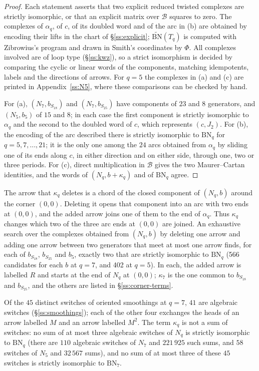 \begin{proof}
Each statement asserts that two explicit reduced twisted complexes are strictly isomorphic, or that
an explicit matrix over $\mathcal B$ squares to zero.  The complexes
of $\alpha_q$, of $c$, of its doubled word and of the arc in (b) are obtained by encoding their lifts
in the chart of \S\ref{ss:explicit}; $\widetilde{\mathrm{BN}}(T_q)$ is computed with Zibrowius's
program \cite{Zibkht} and drawn in Smith's coordinates by $\Phi$.  All complexes involved are of loop
type (\S\ref{ss:kwz}), so a strict isomorphism is decided by comparing the cyclic or linear words of the
components, matching idempotents, labels and the directions of arrows.  For $q=5$ the complexes in (a)
and (c) are printed in Appendix~\ref{ss:N5}, where these comparisons can be checked by hand.

For (a), $(N_7,b_{S_{18}})$ and $(N_7,b_{S_{25}})$ have components of $23$ and $8$ generators, and
$(N_5,b_5)$ of $15$ and $8$; in each case the first component is strictly isomorphic to $\alpha_q$
and the second to the doubled word of $c$, which represents $(c,J_2)$.  For (b), the encoding of the
arc described there is strictly isomorphic to $\mathrm{BN}_q$ for $q=5,7,\dots,21$; it is the only
one among the $24$ arcs obtained from $\alpha_q$ by sliding one of its ends along $c$, in either
direction and on either side, through one, two or three periods.  For (c), direct multiplication in
$\mathcal B$ gives the two Maurer--Cartan identities, and the words of $(N_q,b+\kappa_q)$ and of
$\mathrm{BN}_q$ agree.
\end{proof}

\begin{remark}\label{rem:corner-term}
The arrow that $\kappa_q$ deletes is a chord of the closed component of $(N_q,b)$ around the corner
$(0,0)$.  Deleting it opens that component into an arc with two ends at $(0,0)$, and the added arrow
joins one of them to the end of $\alpha_q$.  Thus $\kappa_q$ changes which two of the three arc ends
at $(0,0)$ are joined.  An exhaustive search over the complexes obtained from
$(N_q,b)$ by deleting one arrow and adding one arrow between two generators that meet at most one
arrow finds, for each of $b_{S_{18}}$, $b_{S_{25}}$ and $b_5$, exactly two that are strictly
isomorphic to $\mathrm{BN}_q$ (566 candidates for each $b$ at $q=7$, and 402 at $q=5$).  In each, the
added arrow is labelled $R$ and starts at the end of $N_q$ at $(0,0)$; $\kappa_7$ is the one common
to $b_{S_{18}}$ and $b_{S_{25}}$, and the others are listed in \S\ref{ss:corner-terms}.

Of the $45$ distinct switches of oriented smoothings at $q=7$, $41$ are algebraic switches
(\S\ref{ss:smoothings}); each of the other four exchanges the heads of
an arrow labelled $M$ and an arrow labelled $M^2$.  The term $\kappa_q$ is not a sum of switches: no sum
of at most three algebraic switches of $N_q$ is strictly isomorphic to $\mathrm{BN}_q$ (there are
$110$ algebraic switches of $N_7$ and $221\,925$ such sums, and $58$ switches of $N_5$ and $32\,567$
sums), and no sum of at most three of these $45$ switches is strictly isomorphic to $\mathrm{BN}_7$.
\end{remark}

